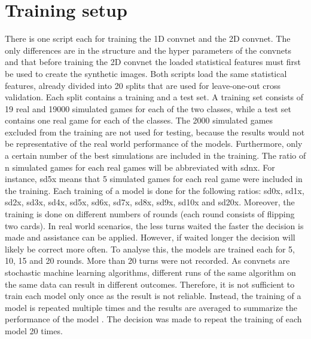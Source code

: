 \newpage

\section{Training setup}
\label{training_setup}
There is one script each for training the 1D convnet and the 2D convnet. The only differences are in the structure and the hyper parameters of the convnets and that before training the 2D convnet the loaded statistical features must first be used to create the synthetic images. Both scripts load the same statistical features, already divided into 20 splits that are used for leave-one-out cross validation. Each split contains a training and a test set. A training set consists of 19 real and 19000 simulated games for each of the two classes, while a test set contains one real game for each of the classes. The 2000 simulated games excluded from the training are not used for testing, because the results would not be representative of the real world performance of the models. Furthermore, only a certain number of the best simulations are included in the training. The ratio of n simulated games for each real games will be abbreviated with sdnx. For instance, sd5x means that 5 simulated games for each real game were included in the training. 
Each training of a model is done for the following ratios: sd0x, sd1x, sd2x, sd3x, sd4x, sd5x, sd6x, sd7x, sd8x, sd9x, sd10x and sd20x. Moreover, the training is done on different numbers of rounds (each round consists of flipping two cards). In real world scenarios, the less turns waited the faster the decision is made and assistance can be applied. However, if waited longer the decision will likely be correct more often. To analyse this, the models are trained each for 5, 10, 15 and 20 rounds. More than 20 turns were not recorded. As convnets are stochastic machine learning algorithms, different runs of the same algorithm on the same data can result in different outcomes. Therefore, it is not sufficient to train each model only once as the result is not reliable. Instead, the training of a model is repeated multiple times and the results are averaged to summarize the performance of the model \cite{repetition}. The decision was made to repeat the training of each model 20 times. 

